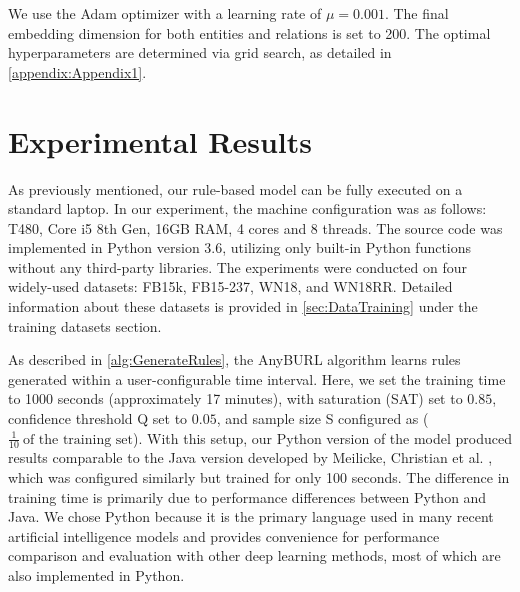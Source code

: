 We use the Adam optimizer with a learning rate of $\mu = 0.001$. The final embedding dimension for both entities and relations is set to 200. The optimal hyperparameters are determined via grid search, as detailed in \autoref{appendix:Appendix1}.


\section{Experimental Results}
\label{sec:Experiment}

As previously mentioned, our rule-based model can be fully executed on a standard laptop. In our experiment, the machine configuration was as follows: T480, Core i5 8th Gen, 16GB RAM, 4 cores and 8 threads. The source code was implemented in Python version 3.6, utilizing only built-in Python functions without any third-party libraries. The experiments were conducted on four widely-used datasets: FB15k, FB15-237, WN18, and WN18RR. Detailed information about these datasets is provided in \autoref{sec:DataTraining} under the training datasets section.

As described in \autoref{alg:GenerateRules}, the AnyBURL algorithm learns rules generated within a user-configurable time interval. Here, we set the training time to 1000 seconds (approximately 17 minutes), with saturation (SAT) set to \(0.85\), confidence threshold Q set to \(0.05\), and sample size S configured as (\(\frac{1}{10}~ \text{of the training set}\)). With this setup, our Python version of the model produced results comparable to the Java version developed by Meilicke, Christian et al. \cite{burl}, which was configured similarly but trained for only 100 seconds. The difference in training time is primarily due to performance differences between Python and Java. We chose Python because it is the primary language used in many recent artificial intelligence models and provides convenience for performance comparison and evaluation with other deep learning methods, most of which are also implemented in Python.



